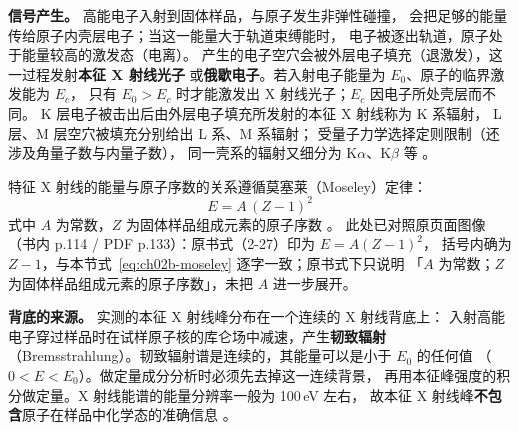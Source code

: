 \begin{principle}
\textbf{信号产生。} 高能电子入射到固体样品，与原子发生非弹性碰撞，
会把足够的能量传给原子内壳层电子；当这一能量大于轨道束缚能时，
电子被逐出轨道，原子处于能量较高的激发态（电离）。
产生的电子空穴会被外层电子填充（退激发），这一过程发射\textbf{本征 X 射线光子}
或\textbf{俄歇电子}。若入射电子能量为 $E_0$、原子的临界激发能为 $E_c$，
只有 $E_0>E_c$ 时才能激发出 X 射线光子；$E_c$ 因电子所处壳层而不同。
K 层电子被击出后由外层电子填充所发射的本征 X 射线称为 K 系辐射，
L 层、M 层空穴被填充分别给出 L 系、M 系辐射；
受量子力学选择定则限制（还涉及角量子数与内量子数），
同一壳系的辐射又细分为 K$\alpha$、K$\beta$ 等
。

特征 X 射线的能量与原子序数的关系遵循莫塞莱（Moseley）定律：
\begin{equation}
E=A\,(Z-1)^{2}
\label{eq:ch02b-moseley}
\end{equation}
式中 $A$ 为常数，$Z$ 为固体样品组成元素的原子序数
。
此处已对照原页面图像（书内 p.114 / PDF p.133）：原书式（2-27）印为 $E=A(Z-1)^{2}$，
括号内确为 $Z-1$，与本节式~\eqref{eq:ch02b-moseley} 逐字一致；原书式下只说明
「$A$ 为常数；$Z$ 为固体样品组成元素的原子序数」，未把 $A$ 进一步展开。

\textbf{背底的来源。} 实测的本征 X 射线峰分布在一个连续的 X 射线背底上：
入射高能电子穿过样品时在试样原子核的库仑场中减速，产生\textbf{韧致辐射}
（Bremsstrahlung）。韧致辐射谱是连续的，其能量可以是小于 $E_0$ 的任何值
（$0<E<E_0$）。做定量成分分析时必须先去掉这一连续背景，
再用本征峰强度的积分做定量。X 射线能谱的能量分辨率一般为 100\,eV 左右，
故本征 X 射线峰\textbf{不包含}原子在样品中化学态的准确信息
。
\end{principle}

